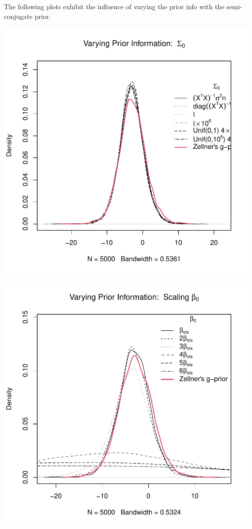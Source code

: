 \documentclass[12pt, a4paper]{article}
\begin{document}
\clearpage

The following plots exhibit the influence of varying the prior info with the semi-conjugate prior.

\includegraphics{Thesis-017}

\includegraphics{Thesis-018}
\end{document}
